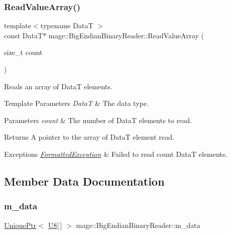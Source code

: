 \subsubsection{\texorpdfstring{Read\+Value\+Array()}{ReadValueArray()}}
{\footnotesize\ttfamily template$<$typename DataT $>$ \\
const DataT$\ast$ mage\+::\+Big\+Endian\+Binary\+Reader\+::\+Read\+Value\+Array (\begin{DoxyParamCaption}\item[{size\+\_\+t}]{count }\end{DoxyParamCaption})\hspace{0.3cm}{\ttfamily [protected]}}

Reads an array of {\ttfamily DataT} elements.


\begin{DoxyTemplParams}{Template Parameters}
{\em DataT} & The data type. \\
\hline
\end{DoxyTemplParams}

\begin{DoxyParams}{Parameters}
{\em count} & The number of {\ttfamily DataT} elements to read. \\
\hline
\end{DoxyParams}
\begin{DoxyReturn}{Returns}
A pointer to the array of {\ttfamily DataT} element read. 
\end{DoxyReturn}

\begin{DoxyExceptions}{Exceptions}
{\em \hyperlink{classmage_1_1_formatted_exception}{Formatted\+Exception}} & Failed to read {\ttfamily count} {\ttfamily DataT} elements. \\
\hline
\end{DoxyExceptions}


\subsection{Member Data Documentation}
\hypertarget{classmage_1_1_big_endian_binary_reader_a54128bdaa233c1bd20494189b2397fe3}{}\label{classmage_1_1_big_endian_binary_reader_a54128bdaa233c1bd20494189b2397fe3} 
\subsubsection{\texorpdfstring{m\+\_\+data}{m\_data}}
{\footnotesize\ttfamily \hyperlink{namespacemage_a3316d7143a973e37adf1110f2e80ca31}{Unique\+Ptr}$<$ \hyperlink{namespacemage_afc638980bc6154f15af5e2d93a0e0ea9}{U8}\mbox{[}$\,$\mbox{]} $>$ mage\+::\+Big\+Endian\+Binary\+Reader\+::m\+\_\+data\hspace{0.3cm}{\ttfamily [private]}}

